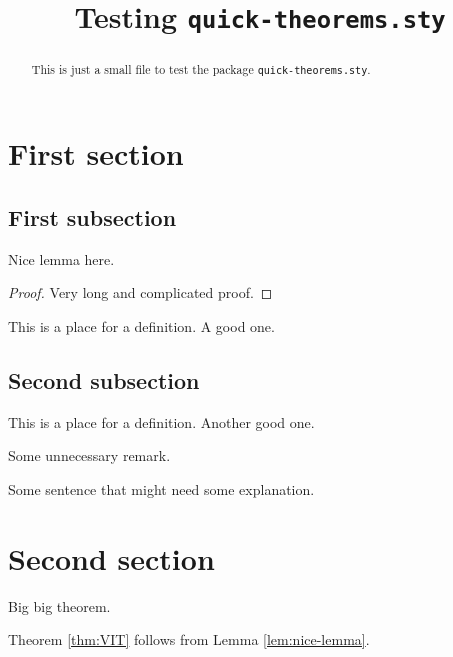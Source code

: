 \documentclass{article}
\title{Testing {\tt quick-theorems.sty}}
\begin{document}
\maketitle

\begin{abstract}
This is just a small file to test the package {\tt quick-theorems.sty}.	
\end{abstract}

\section{First section}

\subsection{First subsection}

\begin{lemma}
\label{lem:nice-lemma}
Nice lemma here.
\end{lemma}
\begin{proof}
Very long and complicated proof.	
\end{proof}

\begin{definition}[test1]
\label{def:test1}
	This is a place for a definition. A good one.
\end{definition}

\subsection{Second subsection}

\begin{definition}[test2]
	This is a place for a definition. Another good one.
\end{definition}


\begin{remark}
Some unnecessary remark.
\end{remark}
Some sentence that might need some explanation. 

\section{Second section}

\begin{theorem}
\label{thm:VIT}
Big big theorem.
\end{theorem}

Theorem \ref{thm:VIT} follows from Lemma \ref{lem:nice-lemma}.




	
\end{document}
